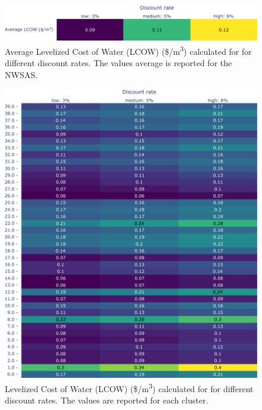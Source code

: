 \documentclass[12pt]{iopart}
\begin{document}
\begin{figure}[!h]
	\centering
	\includegraphics[width=\textwidth]{DRSensitivityAll}
	\caption{Average Levelized Cost of Water (LCOW) (\$/m\textsuperscript{3}) calculated for for different discount rates. The values average is reported for the NWSAS.}
	\label{fig:drsensall}
\end{figure}

\begin{figure}[!h]
	\centering
	\includegraphics[width=\textwidth]{DRSensitivityCluster}
	\caption{Levelized Cost of Water (LCOW) (\$/m\textsuperscript{3}) calculated for for different discount rates. The values are reported for each cluster.}
	\label{fig:drsenscluster}
\end{figure}
\newpage


\newcommand{\newblock}{}


\end{document}
